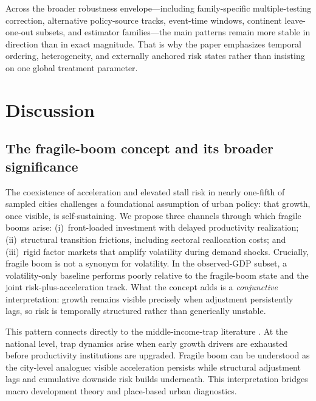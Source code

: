 \documentclass[11pt,a4paper]{article}
\begin{document}
Across the broader robustness envelope---including family-specific multiple-testing correction, alternative policy-source tracks, event-time windows, continent leave-one-out subsets, and estimator families---the main patterns remain more stable in direction than in exact magnitude.
That is why the paper emphasizes temporal ordering, heterogeneity, and externally anchored risk states rather than insisting on one global treatment parameter.

\section{Discussion}
\label{sec:discussion}

\subsection{The fragile-boom concept and its broader significance}
The coexistence of acceleration and elevated stall risk in nearly one-fifth of sampled cities challenges a foundational assumption of urban policy: that growth, once visible, is self-sustaining.
We propose three channels through which fragile booms arise:
(i)~front-loaded investment with delayed productivity realization;
(ii)~structural transition frictions, including sectoral reallocation costs; and
(iii)~rigid factor markets that amplify volatility during demand shocks.
Crucially, fragile boom is not a synonym for volatility.
In the observed-GDP subset, a volatility-only baseline performs poorly relative to the fragile-boom state and the joint risk-plus-acceleration track.
What the concept adds is a \emph{conjunctive} interpretation: growth remains visible precisely when adjustment persistently lags, so risk is temporally structured rather than generically unstable.

This pattern connects directly to the middle-income-trap literature \citep{hausmann2005growth,eichengreen2012slowdown}.
At the national level, trap dynamics arise when early growth drivers are exhausted before productivity institutions are upgraded.
Fragile boom can be understood as the city-level analogue: visible acceleration persists while structural adjustment lags and cumulative downside risk builds underneath.
This interpretation bridges macro development theory and place-based urban diagnostics.
\end{document}
